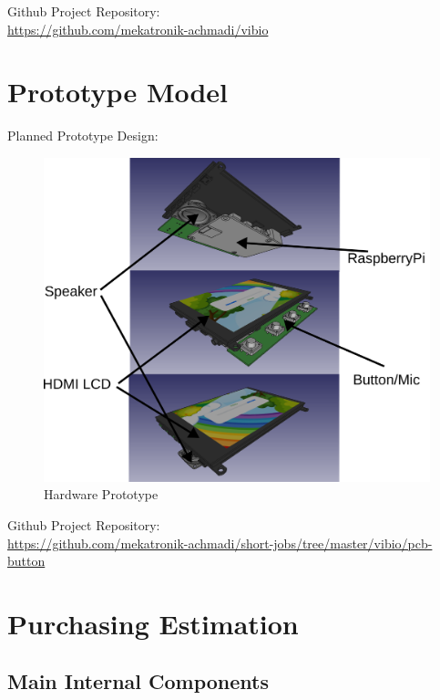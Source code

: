 \documentclass[a4paper,12pt,oneside,pdflatex,italian,final,twocolumn]{article}
\begin{document}
\raggedright
Github Project Repository: \\
\url{https://github.com/mekatronik-achmadi/vibio}

\newpage
\section{Prototype Model}

Planned Prototype Design:

\centering
\begin{figure} [h]
\centering
\includegraphics[width=\textwidth,]{images/proto.png}
\caption{Hardware Prototype}
\end{figure}

\raggedright
Github Project Repository:\\
\url{https://github.com/mekatronik-achmadi/short-jobs/tree/master/vibio/pcb-button}

\newpage
\section{Purchasing Estimation}

\subsection{Main Internal Components}
\end{document}
